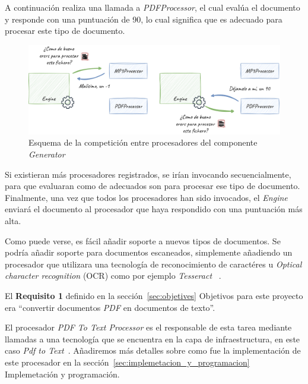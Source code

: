 A continuación realiza una llamada a \textit{PDFProcessor}, el cual evalúa el documento y responde con una puntuación
de 90, lo cual significa que es adecuado para procesar este tipo de documento.

\begin{figure}[ht]
    \begin{center}
        \includegraphics[width=\textwidth]{./chapter/4/images/chapter_4.1.generator_component_processors}
        \caption{Esquema de la competición entre procesadores del componente \textit{Generator}}
        \label{fig:chapter_4.1.generator_component_processors}
    \end{center}
\end{figure}

Si existieran más procesadores registrados, se irían invocando secuencialmente, para que evaluaran como de adecuados
son para procesar ese tipo de documento.
Finalmente, una vez que todos los procesadores han sido invocados, el \textit{Engine} enviará el documento al procesador
que haya respondido con una puntuación más alta.

Como puede verse, es fácil añadir soporte a nuevos tipos de documentos.
Se podría añadir soporte para documentos escaneados, simplemente añadiendo un procesador que utilizara una tecnología
de reconocimiento de caractéres u \textit{Optical character recognition} (OCR) como por ejemplo \textit{Tesseract}
~\cite{url_tesseract}.

El \textbf{Requisito 1} definido en la sección~\ref{sec:objetives} Objetivos para este proyecto era
``convertir documentos \textit{PDF} en documentos de texto''.

El procesador \textit{PDF To Text Processor} es el responsable de esta tarea mediante llamadas a una tecnología que se
encuentra en la capa de infraestructura, en este caso
\textit{Pdf to Text}~\cite{url_pdftotextl}.
Añadiremos más detalles sobre como fue la implementación de este procesador en la
sección~\ref{sec:implemetacion_y_programacion} Implemetación y programación.


